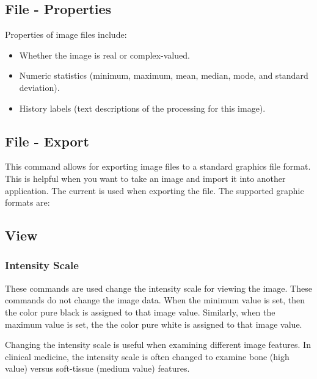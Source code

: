 \subsection{File - Properties}
Properties of image files include:
\begin{itemize}\itemsep=0pt
  \item Whether the image is real or complex-valued.
  \item Numeric statistics (minimum, maximum, mean, median, mode, and standard deviation).
  \item History labels (text descriptions of the processing for this image).
\end{itemize}

\subsection{File - Export}\label{IDH_DLG_EXPORT}
This command allows for exporting image files to a standard
graphics file format. This is helpful when you want to take an
image and import it into another application. The current
 is used when exporting
the file. The supported graphic formats are:

\begin{twocollist}
\end{twocollist}


\subsection{View}
\subsubsection{Intensity Scale}\label{intensityscale}
These commands are used change the intensity scale for viewing the image.
These commands do not change the image data. When the minimum value is
set, then the color pure black is assigned to that image value. Similarly,
when the maximum value is set, the the color pure white is assigned to that
image value.

Changing the intensity scale is useful when examining different image features.
In clinical medicine, the intensity scale is often changed to examine bone
(high value) versus soft-tissue (medium value) features.

